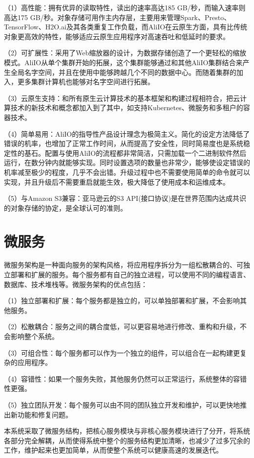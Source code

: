 （1）高性能：拥有优异的读取特性，读出的速率高达185 GB/秒，而输入速率则高达175 GB/秒。对象存储可用作主内存层，主要用来管理Spark、Presto、TensorFlow、H2O.ai及其各类重复工作负载，而AliIO在云原生方面，具有比传统对象更高效的特性，能够适应云原生应用程序对高速吞吐和低延时的要求。

（2）可扩展性：采用了Web缩放器的设计，为数据存储创造了一个更轻松的缩放模式。AliIO从单个集群开始的拓展，这个集群能够通过和其他AliIO集群结合来产生全局名字空间，并且在使用中能够跨越几个不同的数据中心。而随着集群的加入，更多集群计算机也能够对名字空间进行拓展。

（3）云原生支持：和所有原生云计算技术的基本框架和构建过程相符合，把云计算技术的新技术和概念都加入到了其中，如支持Kubernetes、微服务和多租户的容器技术。

（4）简单易用：AliIO的指导性产品设计理念为极简主义。简化的设定方法降低了错误的机率，也增加了正常工作时间，从而提高了安全性，同时简易度也是系统稳定性的基石。配置与使用AliIO的流程都非常简洁，只需加载一个二进制软件然后运行，在数分钟内就能够实现。同时设置选项的数量也非常少，能够使设定错误的机率减至极少的程度，几乎不会出错。升级过程中也不需要使用简单的命令就可以实现，并且升级后不需要重启就能生效，极大降低了使用成本和运维成本。

（5）与Amazon S3兼容：亚马逊云的S3 API(接口协议)是在世界范围内达成共识的对象存储的协定\cite{kongq2eji}，是全球认可的准则。




\section{微服务}


微服务架构是一种面向服务的架构风格，将应用程序拆分为一组松散耦合的、可独立部署和扩展的服务\cite{koyong2015keji}。每个服务都有自己的独立进程，可以使用不同的编程语言、数据库、技术堆栈等。微服务架构的优点包括：

（1）独立部署和扩展：每个服务都是独立的，可以单独部署和扩展，不会影响其他服务。

（2）松散耦合：服务之间的耦合度低，可以更容易地进行修改、重构和升级，不会影响整个系统。

（3）可组合性：每个服务都可以作为一个独立的组件，可以组合在一起构建更复杂的应用程序。

（4）容错性：如果一个服务失败，其他服务仍然可以正常运行，系统整体的容错性更强。

（5）独立团队开发：每个服务可以由不同的团队独立开发和维护，可以更快地推出新功能和修复问题。

本系统采取了微服务结构，把核心服务模块与非核心服务模块进行了分开，将系统各部分完全解耦，从而使得系统中整个的服务结构更加清晰，也减少了过多冗余的工作，维护起来也更加简单，从而使整个系统可以健康高速的发展迭代。

